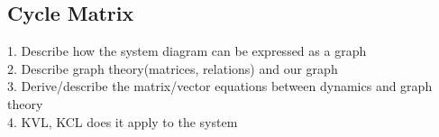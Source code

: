  
%
%

 
\subsection{Cycle Matrix} 

1. Describe how the system diagram can be expressed as a graph \\
2. Describe graph theory(matrices, relations) and our graph\\
3. Derive/describe the matrix/vector equations between dynamics and graph theory\\
4. KVL, KCL does it apply to the system 

